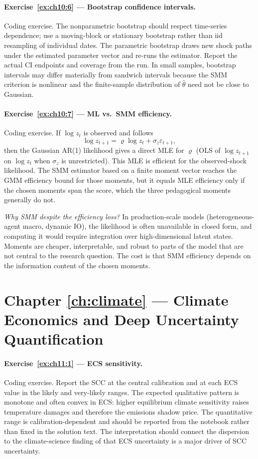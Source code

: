 \documentclass[11pt,a4paper]{report}
\begin{document}
\paragraph{Exercise~\ref{ex:ch10:6} --- Bootstrap confidence intervals.}
Coding exercise.  The nonparametric bootstrap should respect time-series dependence; use a moving-block or stationary bootstrap rather than iid resampling of individual dates.  The parametric bootstrap draws new shock paths under the estimated parameter vector and re-runs the estimator.  Report the actual CI endpoints and coverage from the run.  In small samples, bootstrap intervals may differ materially from sandwich intervals because the SMM criterion is nonlinear and the finite-sample distribution of $\hat\theta$ need not be close to Gaussian.

\paragraph{Exercise~\ref{ex:ch10:7} --- ML vs.\ SMM efficiency.}
Coding exercise.  If $\log z_t$ is observed and follows
\[
\log z_{t+1}=\varrho\log z_t+\sigma_z\varepsilon_{t+1},
\]
then the Gaussian AR(1) likelihood gives a direct MLE for $\varrho$ (OLS of $\log z_{t+1}$ on $\log z_t$ when $\sigma_z$ is unrestricted).  This MLE is efficient for the observed-shock likelihood.  The SMM estimator based on a finite moment vector reaches the GMM efficiency bound for those moments, but it equals MLE efficiency only if the chosen moments span the score, which the three pedagogical moments generally do not.

\emph{Why SMM despite the efficiency loss?}  In production-scale models (heterogeneous-agent macro, dynamic IO), the likelihood is often unavailable in closed form, and computing it would require integration over high-dimensional latent states.  Moments are cheaper, interpretable, and robust to parts of the model that are not central to the research question.  The cost is that SMM efficiency depends on the information content of the chosen moments.

\section{Chapter \ref{ch:climate} --- Climate Economics and Deep Uncertainty Quantification}
\label{sol:ch11}

\paragraph{Exercise~\ref{ex:ch11:1} --- ECS sensitivity.}
Coding exercise.  Report the SCC at the central calibration and at each ECS value in the likely and very-likely ranges.  The expected qualitative pattern is monotone and often convex in ECS: higher equilibrium climate sensitivity raises temperature damages and therefore the emissions shadow price.  The quantitative range is calibration-dependent and should be reported from the notebook rather than fixed in the solution text.  The interpretation should connect the dispersion to the climate-science finding of \citet{sherwood2020assessment} that ECS uncertainty is a major driver of SCC uncertainty.
\end{document}
